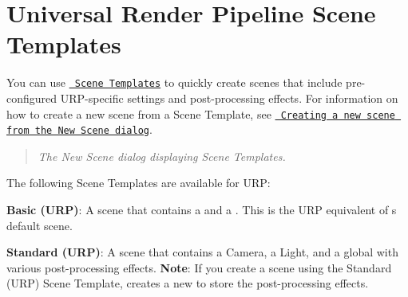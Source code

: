 \chapter{Universal Render Pipeline Scene Templates}
\hypertarget{md__hey_tea_9_2_library_2_package_cache_2com_8unity_8render-pipelines_8universal_0d14_80_88_2_documentation_0i_2scene-templates}{}\label{md__hey_tea_9_2_library_2_package_cache_2com_8unity_8render-pipelines_8universal_0d14_80_88_2_documentation_0i_2scene-templates}
\label{md__hey_tea_9_2_library_2_package_cache_2com_8unity_8render-pipelines_8universal_0d14_80_88_2_documentation_0i_2scene-templates_autotoc_md2453}%
%
 You can use \href{https://docs.unity3d.com/Manual/scene-templates.html}{\texttt{ Scene Templates}} to quickly create scenes that include pre-\/configured URP-\/specific settings and post-\/processing effects. For information on how to create a new scene from a Scene Template, see \href{https://docs.unity3d.com/Manual/scenes-working-with.html\#creating-a-new-scene-from-the-new-scene-dialog}{\texttt{ Creating a new scene from the New Scene dialog}}.



\begin{quote}
{\itshape The New Scene dialog displaying Scene Templates.} \end{quote}


The following Scene Templates are available for URP\+:


\begin{DoxyItemize}
\item {\bfseries{Basic (URP)}}\+: A scene that contains a  and a . This is the URP equivalent of \textquotesingle{}s default scene.
\item {\bfseries{Standard (URP)}}\+: A scene that contains a Camera, a Light, and a global  with various post-\/processing effects. {\bfseries{Note}}\+: If you create a scene using the Standard (URP) Scene Template,  creates a new  to store the post-\/processing effects. 
\end{DoxyItemize}